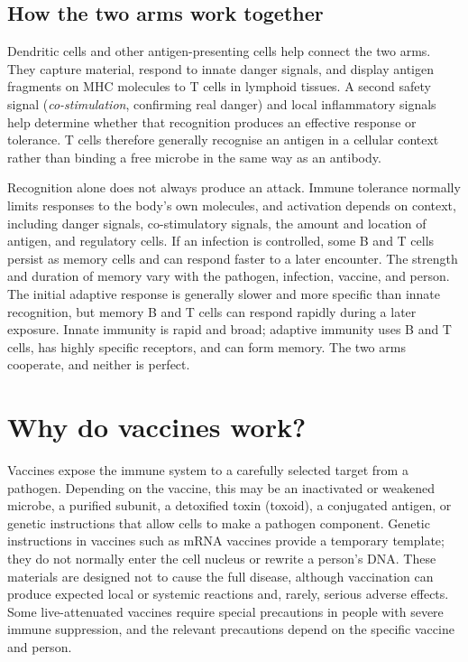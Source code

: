 \documentclass[11pt,oneside]{report}
\begin{document}
\subsection*{How the two arms work together}

Dendritic cells and other antigen-presenting cells help connect the two arms.
They capture material, respond to innate danger signals, and display antigen
fragments on MHC molecules to T cells in lymphoid tissues. A second safety
signal (\emph{co-stimulation}, confirming real danger) and local inflammatory
signals help determine whether that recognition produces an effective response
or tolerance. T cells therefore generally recognise an
antigen in a cellular context rather than binding a free microbe in the same way
as an antibody.

Recognition alone does not always produce an attack. Immune tolerance normally
limits responses to the body's own molecules, and activation depends on context,
including danger signals, co-stimulatory signals, the amount and location of
antigen, and regulatory cells. If an infection is controlled, some B and T cells
persist as memory cells and can respond faster to a later encounter. The
strength and duration of memory vary with the pathogen, infection, vaccine,
and person. The initial adaptive response is generally slower and more specific
than innate recognition, but memory B and T cells can respond rapidly during a
later exposure. Innate immunity is rapid and broad; adaptive immunity uses B and
T cells, has highly specific receptors, and can form memory. The two arms
cooperate, and neither is perfect.

\section{Why do vaccines work?}

Vaccines expose the immune system to a carefully selected target from a
pathogen. Depending on the vaccine, this may be an inactivated or weakened
microbe, a purified subunit, a detoxified toxin (toxoid), a conjugated antigen,
or genetic instructions that allow cells to make a pathogen component. Genetic
instructions in vaccines such as mRNA vaccines provide a temporary template;
they do not normally enter the cell nucleus or rewrite a person's DNA. These
materials are designed not to cause the full disease, although vaccination can
produce expected local or systemic reactions and, rarely, serious adverse
effects. Some live-attenuated vaccines require special precautions in people
with severe immune suppression, and the relevant precautions depend on the
specific vaccine and person.
\end{document}
